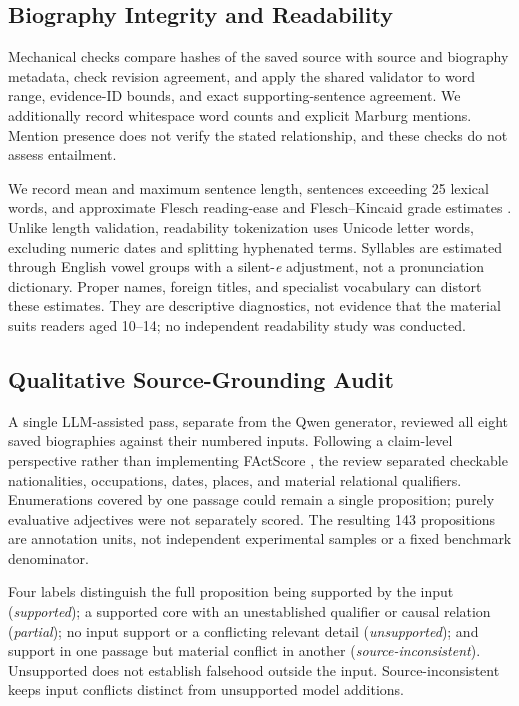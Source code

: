 \documentclass[11pt]{article}
\begin{document}
\subsection{Biography Integrity and Readability}

Mechanical checks compare hashes of the saved source with source and biography metadata, check revision agreement, and apply the shared validator to word range, evidence-ID bounds, and exact supporting-sentence agreement. We additionally record whitespace word counts and explicit Marburg mentions. Mention presence does not verify the stated relationship, and these checks do not assess entailment.

We record mean and maximum sentence length, sentences exceeding 25 lexical words, and approximate Flesch reading-ease and Flesch--Kincaid grade estimates \citep{flesch-1948-readability,kincaid-etal-1975-readability}. Unlike length validation, readability tokenization uses Unicode letter words, excluding numeric dates and splitting hyphenated terms. Syllables are estimated through English vowel groups with a silent-\emph{e} adjustment, not a pronunciation dictionary. Proper names, foreign titles, and specialist vocabulary can distort these estimates. They are descriptive diagnostics, not evidence that the material suits readers aged 10--14; no independent readability study was conducted.

\subsection{Qualitative Source-Grounding Audit}

A single LLM-assisted pass, separate from the Qwen generator, reviewed all eight saved biographies against their numbered inputs. Following a claim-level perspective rather than implementing FActScore \citep{min-etal-2023-factscore}, the review separated checkable nationalities, occupations, dates, places, and material relational qualifiers. Enumerations covered by one passage could remain a single proposition; purely evaluative adjectives were not separately scored. The resulting 143 propositions are annotation units, not independent experimental samples or a fixed benchmark denominator.

Four labels distinguish the full proposition being supported by the input (\emph{supported}); a supported core with an unestablished qualifier or causal relation (\emph{partial}); no input support or a conflicting relevant detail (\emph{unsupported}); and support in one passage but material conflict in another (\emph{source-inconsistent}). Unsupported does not establish falsehood outside the input. Source-inconsistent keeps input conflicts distinct from unsupported model additions.
\end{document}
